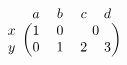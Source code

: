 \documentclass{article}
\begin{document}
\[
\begin{blockarray}{ccccc}
 & a & b & c & d\\
\begin{block}{c(cccc)}
 x & 1 & 0 & \BAmulticolumn{2}{c}{0}\\
 y & 0 & 1 & 2 & 3\\
\end{block}
\BAnoalign{\vskip 1ex}
\end{blockarray}
\]
\end{document}
